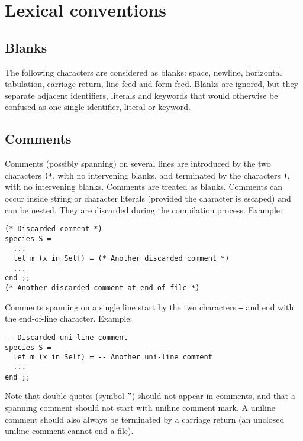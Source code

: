 
\section{Lexical conventions}

\subsection{Blanks}
The following characters are considered as blanks: space, newline,
horizontal tabulation, carriage return, line feed and form
feed. Blanks are ignored, but they separate adjacent identifiers,
literals and keywords that would otherwise be confused as one single
identifier, literal or keyword.

\subsection{Comments}
Comments (possibly spanning) on several lines are introduced by the
two characters {\tt (*}, with no intervening blanks, and terminated by
the characters {\tt *)}, with no intervening blanks. Comments are
treated as blanks. Comments can occur inside string or character
literals (provided the {\tt *} character is escaped) and can be nested. They
are discarded during the compilation process. Example:
{\scriptsize
\begin{lstlisting}
(* Discarded comment *)
species S =
  ...
  let m (x in Self) = (* Another discarded comment *)
  ...
end ;;
(* Another discarded comment at end of file *)
\end{lstlisting}
}

Comments spanning on a single line start by the two characters
{\tt --} and end with the end-of-line character.
Example:
{\scriptsize
\begin{lstlisting}
-- Discarded uni-line comment
species S =
  let m (x in Self) = -- Another uni-line comment
  ...
end ;;
\end{lstlisting}
}

Note that double quotes (symbol $"$) should not appear in comments, and that
a spanning comment should not start with uniline comment mark. A uniline
comment should also always be terminated by a carriage return (an unclosed
uniline comment cannot end a file).

